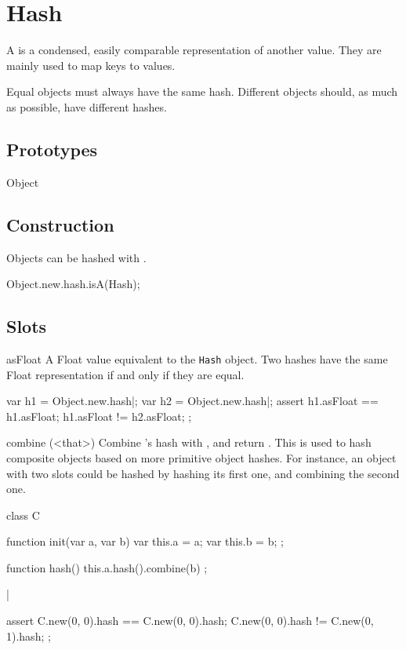 
\section{Hash}

A  is a condensed, easily comparable representation of another
value. They are mainly used to map  keys to values.

Equal objects must always have the same hash. Different objects should, as
much as possible, have different hashes.

\subsection{Prototypes}
\begin{refObjects}
\item[Object]
\end{refObjects}

\subsection{Construction}
Objects can be hashed with .
\begin{urbiassert}
Object.new.hash.isA(Hash);
\end{urbiassert}

\subsection{Slots}
\begin{urbiscriptapi}
\item[asFloat] A Float value equivalent to the \lstinline|Hash| object. Two
  hashes have the same Float representation if and only if they are equal.
\begin{urbiscript}
var h1 = Object.new.hash|;
var h2 = Object.new.hash|;
assert
{
  h1.asFloat == h1.asFloat;
  h1.asFloat != h2.asFloat;
};
\end{urbiscript}


\item[combine](<that>)%
  Combine \that's hash with \this, and return \this. This is used to hash
  composite objects based on more primitive object hashes. For instance, an
  object with two slots could be hashed by hashing its first one, and
  combining the second one.

\begin{urbiscript}
class C
{
  function init(var a, var b)
  {
    var this.a = a;
    var this.b = b;
  };

  function hash()
  {
    this.a.hash().combine(b)
  };
}|

assert
{
  C.new(0, 0).hash == C.new(0, 0).hash;
  C.new(0, 0).hash != C.new(0, 1).hash;
};
\end{urbiscript}
\end{urbiscriptapi}

